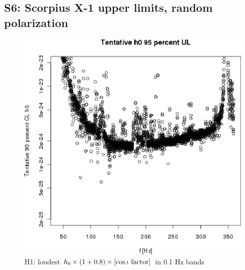 \subsection{S6: Scorpius X-1 upper limits, random polarization}

\begin{figure}
\begin{center}
\includegraphics[width=0.4\paperwidth,height=0.2\paperheight]{plots/h0FullUL95logGuess-H1.eps}
\caption{
H1: loudest $h_0 \times \left( 1 + 0.8 \right) \times \left[\cos \iota \textup{ factor}\right]$ in 0.1 Hz bands}
\end{center}
\end{figure}

